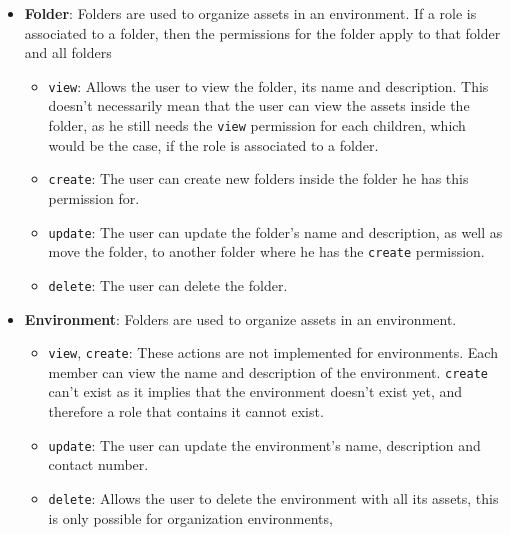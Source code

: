 \begin{itemize}
	\item \textbf{Folder}: Folders are used to organize assets in an environment.
	      If a role is associated to a folder, then the permissions for the folder apply to that
	      folder and all folders
	      \begin{itemize}
		      \item \lstinline{view}: Allows the user to view the folder, its name and description.
		            This doesn't necessarily mean that the user can view the assets inside the folder,
		            as he still needs the \lstinline{view} permission for each children, which would be
		            the case, if the role is associated to a folder.
		      \item \lstinline{create}: The user can create new folders inside the folder he has this
		            permission for.
		      \item \lstinline{update}: The user can update the folder's name and description, as
		            well as move the folder, to another folder where he has the \lstinline{create}
		            permission.

		      \item \lstinline{delete}: The user can delete the folder.
	      \end{itemize}
	\item \textbf{Environment}: Folders are used to organize assets in an environment.
	      \begin{itemize}
		      \item \lstinline{view}, \lstinline{create}: These actions are not implemented for
		            environments.
		            Each member can view the name and description of the environment.
		            \lstinline{create} can't exist as it implies that the environment doesn't exist
		            yet, and therefore a role that contains it cannot exist.
		      \item \lstinline{update}: The user can update the environment's name, description
		            and contact number.
		      \item \lstinline{delete}: Allows the user to delete the environment with all its
		            assets, this is only possible for organization environments,
	      \end{itemize}
\end{itemize}

